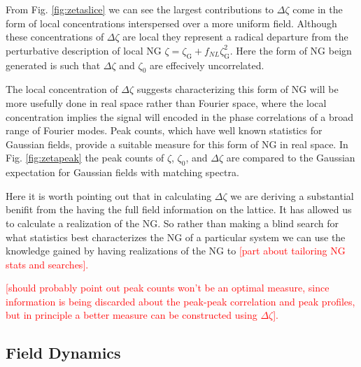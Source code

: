 From Fig. \ref{fig:zetaslice} we can see the largest contributions to $\Delta\zeta$ come in the form of local concentrations interspersed over a more uniform field. Although these concentrations of $\Delta\zeta$ are local they represent a radical departure from the perturbative description of local NG $\zeta = \zeta_\mathrm{G} + f_{NL}\zeta^2_\mathrm{G}$. Here the form of NG beign generated is such that $\Delta\zeta$ and $\zeta_0$ are effecively uncorrelated.

The local concentration of $\Delta\zeta$ suggests characterizing this form of NG will be more usefully done in real space rather than Fourier space, where the local concentration implies the signal will encoded in the phase correlations of a broad range of Fourier modes. Peak counts, which have well known statistics for Gaussian fields, provide a suitable measure for this form of NG in real space. In Fig. \ref{fig:zetapeak} the peak counts of $\zeta$, $\zeta_0$, and $\Delta\zeta$ are compared to the Gaussian expectation for Gaussian fields with matching spectra. 

Here it is worth pointing out that in calculating $\Delta\zeta$ we are deriving a substantial benifit from the having the full field information on the lattice. It has allowed us to calculate a realization of the NG. So rather than making a blind search for what statistics best characterizes the NG of a particular system we can use the knowledge gained by having realizations of the NG to \textcolor{red}{[part about tailoring NG stats and searches].}

\textcolor{red}{[should probably point out peak counts won't be an optimal measure, since information is being discarded about the peak-peak correlation and peak profiles, but in principle a better measure can be constructed using $\Delta\zeta$].}


\Fzetaslice
\Fzetapeak

\subsection{Field Dynamics} \label{sec:field dynamics}

